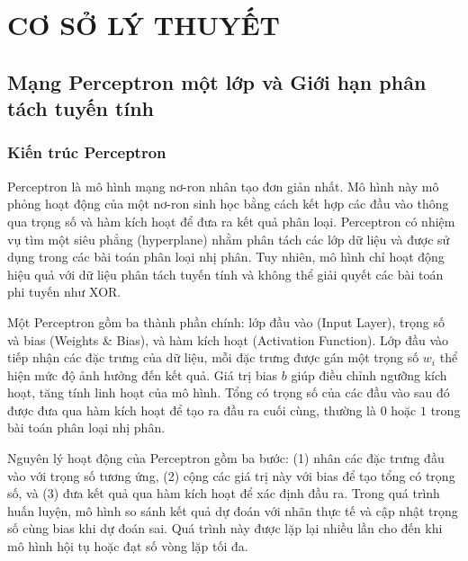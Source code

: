 \documentclass[12pt,a4paper]{report}
\begin{document}
\chapter{CƠ SỞ LÝ THUYẾT}

\section{Mạng Perceptron một lớp và Giới hạn phân tách tuyến tính}
\subsection{Kiến trúc Perceptron}
Perceptron là mô hình mạng nơ-ron nhân tạo đơn giản nhất. Mô hình này mô phỏng hoạt động của một nơ-ron sinh học bằng cách kết hợp các đầu vào thông qua trọng số và hàm kích hoạt để đưa ra kết quả phân loại. Perceptron có nhiệm vụ tìm một siêu phẳng (hyperplane) nhằm phân tách các lớp dữ liệu và được sử dụng trong các bài toán phân loại nhị phân. Tuy nhiên, mô hình chỉ hoạt động hiệu quả với dữ liệu phân tách tuyến tính và không thể giải quyết các bài toán phi tuyến như XOR.

Một Perceptron gồm ba thành phần chính: lớp đầu vào (Input Layer), trọng số và bias (Weights \& Bias), và hàm kích hoạt (Activation Function). Lớp đầu vào tiếp nhận các đặc trưng của dữ liệu, mỗi đặc trưng được gán một trọng số $w_i$ thể hiện mức độ ảnh hưởng đến kết quả. Giá trị bias $b$ giúp điều chỉnh ngưỡng kích hoạt, tăng tính linh hoạt của mô hình. Tổng có trọng số của các đầu vào sau đó được đưa qua hàm kích hoạt để tạo ra đầu ra cuối cùng, thường là $0$ hoặc $1$ trong bài toán phân loại nhị phân. 

Nguyên lý hoạt động của Perceptron gồm ba bước: (1) nhân các đặc trưng đầu vào với trọng số tương ứng, (2) cộng các giá trị này với bias để tạo tổng có trọng số, và (3) đưa kết quả qua hàm kích hoạt để xác định đầu ra. Trong quá trình huấn luyện, mô hình so sánh kết quả dự đoán với nhãn thực tế và cập nhật trọng số cùng bias khi dự đoán sai. Quá trình này được lặp lại nhiều lần cho đến khi mô hình hội tụ hoặc đạt số vòng lặp tối đa.
\end{document}
